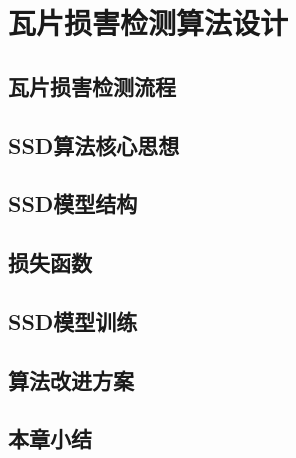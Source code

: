 \section{瓦片损害检测算法设计}
\setcounter{figure}{0}

\subsection{瓦片损害检测流程}

\subsection{SSD算法核心思想}

\subsection{SSD模型结构}

\subsection{损失函数}

\subsection{SSD模型训练}

\subsection{算法改进方案}

\subsection{本章小结}
